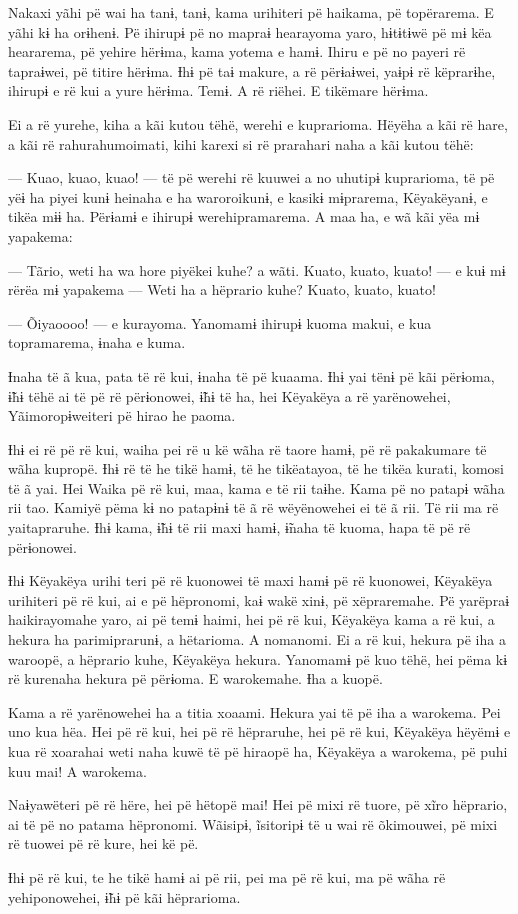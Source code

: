 Nakaxi yãhi pë wai ha tanɨ, tanɨ, kama urihiteri pë haikama, pë
topërarema. E yãhi kɨ ha orɨhenɨ. Pë ihirupɨ pë no mapraɨ hearayoma
yaro, hɨtɨtɨwë pë mɨ këa heararema, pë yehire hërɨma, kama yotema e
hamɨ. Ihiru e pë no payeri rë tapraɨwei, pë titire hërɨma. Ɨhɨ pë taɨ
makure, a rë përɨaɨwei, yaɨpɨ rë këprarɨhe, ihirupɨ e rë kui a yure
hërɨma. Temɨ. A rë riëhei. E tikëmare hërɨma. 

Ei a rë yurehe, kiha a kãi kutou tëhë, werehi e kuprarioma. Hëyëha a kãi
rë hare, a kãi rë rahurahumoimati, kihi karexi si rë prarahari naha a
kãi kutou tëhë: 

--- Kuao, kuao, kuao! --- të pë werehi rë kuuwei a no uhutipɨ
kuprarioma, të pë yëɨ ha piyei kunɨ heinaha e ha waroroikunɨ, e kasikɨ
mɨprarema, Këyakëyanɨ, e tikëa mɨɨ ha. Përɨamɨ e ihirupɨ
werehipramarema. A maa ha, e wã kãi yëa mɨ yapakema: 

--- Tãrio, weti ha wa hore piyëkei kuhe? a wãti. Kuato, kuato, kuato!
--- e kuɨ mɨ rërëa mɨ yapakema --- Weti ha a hëprario kuhe? Kuato,
kuato, kuato! 

--- Õiyaoooo! --- e kurayoma. Yanomamɨ ihirupɨ kuoma makui, e kua
topramarema, ɨnaha e kuma. 

Ɨnaha të ã kua, pata të rë kui, ɨnaha të pë kuaama. Ɨhɨ yai tënɨ pë kãi
përɨoma, ɨ̃hɨ tëhë ai të pë rë përɨonowei, ɨ̃hɨ të ha, hei Këyakëya a rë
yarënowehei, Yãimoropɨweiteri pë hirao he paoma. 

Ɨhɨ ei rë pë rë kui, waiha pei rë u kë wãha rë taore hamɨ, pë rë
pakakumare të wãha kupropë. Ɨhɨ rë të he tikë hamɨ, të he tikëatayoa, të
he tikëa kurati, komosi të ã yai. Hei Waika pë rë kui, maa, kama e të
rii taɨhe. Kama pë no patapɨ wãha rii tao. Kamiyë pëma kɨ no patapɨnɨ të
ã rë wëyënowehei ei të ã rii. Të rii ma rë yaitapraruhe. Ɨhɨ kama, ɨ̃hɨ
të rii maxi hamɨ, ɨ̃naha të kuoma, hapa të pë rë përɨonowei. 

Ɨhɨ Këyakëya urihi teri pë rë kuonowei të maxi hamɨ pë rë kuonowei,
Këyakëya urihiteri pë rë kui, ai e pë hëpronomi, kaɨ wakë xinɨ, pë
xëpraremahe. Pë yarëpraɨ haikirayomahe yaro, ai pë temɨ haimi, hei pë rë
kui, Këyakëya kama a rë kui, a hekura ha parimiprarunɨ, a hëtarioma. A nomanomi. Ei a rë kui, hekura pë iha a waroopë, a hëprario kuhe,
Këyakëya hekura. Yanomamɨ pë kuo tëhë, hei pëma kɨ rë kurenaha hekura pë
përɨoma. E warokemahe. Ɨha a kuopë. 

Kama a rë yarënowehei ha a titia xoaami. Hekura yai të pë iha a
warokema. Pei uno kua hëa. Hei pë rë kui, hei pë rë hëpraruhe, hei pë rë
kui, Këyakëya hëyëmɨ e kua rë xoarahai weti naha kuwë të pë hiraopë ha,
Këyakëya a warokema, pë puhi kuu mai! A warokema. 

Naɨyawëteri pë rë hëre, hei pë hëtopë mai! Hei pë mixi rë tuore, pë xĩro
hëprario, ai të pë no patama hëpronomi. Wãisipɨ, ĩsitoripɨ të u wai rë
õkimouwei, pë mixi rë tuowei pë rë kure, hei kë pë. 

Ɨhɨ pë rë kui, te he tikë hamɨ ai pë rii, pei ma pë rë kui, ma pë wãha
rë yehiponowehei, ɨ̃hɨ pë kãi hëprarioma.

 
